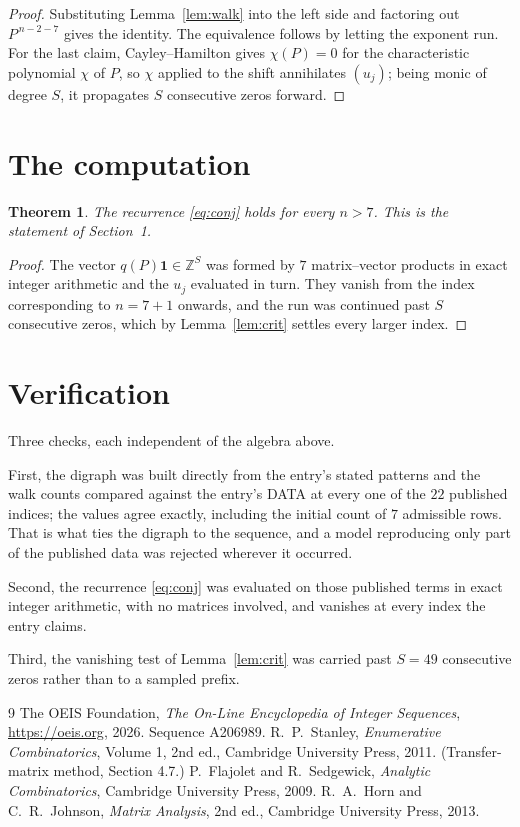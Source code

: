 \documentclass[11pt,a4paper]{article}
\theoremstyle{plain}
\newtheorem{theorem}{Theorem}
\theoremstyle{definition}
\begin{document}
\begin{proof}
Substituting Lemma~\ref{lem:walk} into the left side and factoring out
$P^{\,n-2-7}$ gives the identity. The equivalence follows by letting the exponent
run. For the last claim, Cayley--Hamilton gives $\chi(P)=0$ for the characteristic
polynomial $\chi$ of $P$, so $\chi$ applied to the shift annihilates $(u_j)$; being monic of
degree $S$, it propagates $S$ consecutive zeros forward.
\end{proof}

\section{The computation}

\begin{theorem}
The recurrence \eqref{eq:conj} holds for every $n>7$. This is the statement of
Section~1.
\end{theorem}

\begin{proof}
The vector $q(P)\mathbf{1}\in\mathbb{Z}^{S}$ was formed by $7$ matrix--vector
products in exact integer arithmetic and the $u_j$ evaluated in turn. They vanish from the
index corresponding to $n=7+1$ onwards, and the run was continued past $S$ consecutive
zeros, which by Lemma~\ref{lem:crit} settles every larger index.
\end{proof}

\section{Verification}

Three checks, each independent of the algebra above.

First, the digraph was built directly from the entry's stated patterns and the walk counts
compared against the entry's DATA at every one of the $22$ published indices; the
values agree exactly, including the initial count of $7$ admissible rows. That is
what ties the digraph to the sequence, and a model reproducing only part of the published
data was rejected wherever it occurred.

Second, the recurrence \eqref{eq:conj} was evaluated on those published terms in exact
integer arithmetic, with no matrices involved, and vanishes at every index the entry claims.

Third, the vanishing test of Lemma~\ref{lem:crit} was carried past $S=49$ consecutive
zeros rather than to a sampled prefix.

\begin{thebibliography}{9}
 The OEIS Foundation, \emph{The On-Line Encyclopedia of Integer
Sequences}, \url{https://oeis.org}, 2026. Sequence A206989.
 R.~P.~Stanley, \emph{Enumerative Combinatorics}, Volume 1, 2nd ed.,
Cambridge University Press, 2011. (Transfer-matrix method, Section 4.7.)
 P.~Flajolet and R.~Sedgewick, \emph{Analytic Combinatorics}, Cambridge
University Press, 2009.
 R.~A.~Horn and C.~R.~Johnson, \emph{Matrix Analysis}, 2nd ed., Cambridge
University Press, 2013.
\end{thebibliography}
\end{document}
